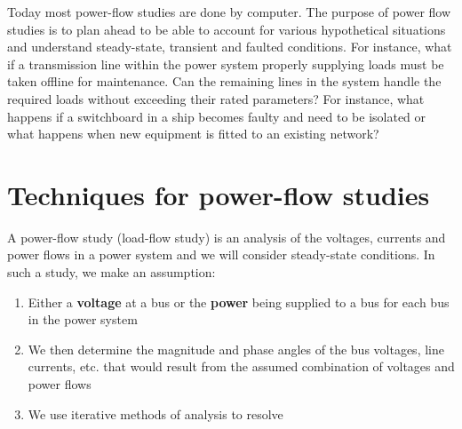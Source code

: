 Today most power-flow studies are done by computer. The purpose of power flow studies is to plan ahead to be able to account for various hypothetical situations and understand steady-state, transient and faulted conditions. For instance, what if a transmission line within the power system properly supplying loads must be taken offline for maintenance. Can the remaining lines in the system handle the required loads without exceeding their rated parameters? For instance, what happens if a switchboard in a ship becomes faulty and need to be isolated or what happens when new equipment is fitted to an existing network?
\section{Techniques for power-flow studies}
A power-flow study (load-flow study) is an analysis of the voltages, currents and power flows in a power system and we will consider steady-state conditions. In such a study, we make an assumption:
\begin{enumerate}
	\item Either a \textbf{voltage} at a bus or the \textbf{power} being supplied to a bus for each bus in the power system
	\item We then determine the magnitude and phase angles of the bus voltages, line currents, etc. that would result from the assumed combination of voltages and power flows
	\item We use iterative methods of analysis to resolve
\end{enumerate}
